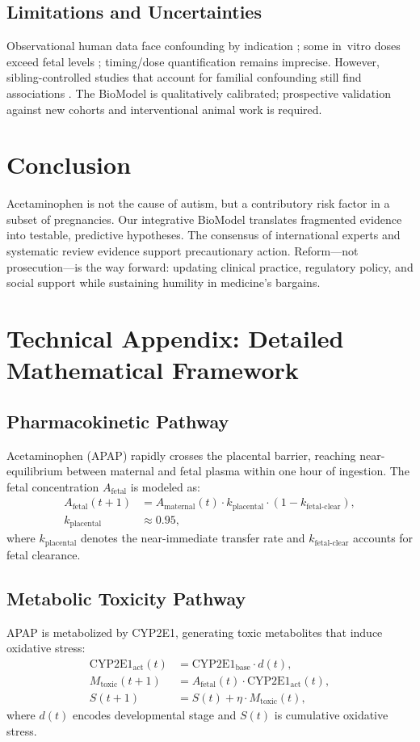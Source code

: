 \documentclass[12pt]{article}
\begin{document}
\subsection{Limitations and Uncertainties}
Observational human data face confounding by indication \citep{leppert2019}; some in~vitro doses exceed fetal levels \citep{perez2012}; timing/dose quantification remains imprecise. However, sibling-controlled studies that account for familial confounding still find associations \citep{brandlistuen2013,stergiakouli2016}. The BioModel is qualitatively calibrated; prospective validation against new cohorts and interventional animal work is required.

\section{Conclusion}
Acetaminophen is not the cause of autism, but a contributory risk factor in a subset of pregnancies. Our integrative BioModel translates fragmented evidence into testable, predictive hypotheses. The consensus of international experts \citep{bauer2021} and systematic review evidence \citep{navarro2025,masarwa2018} support precautionary action. Reform---not prosecution---is the way forward: updating clinical practice, regulatory policy, and social support while sustaining humility in medicine's bargains.

\appendix
\section{Technical Appendix: Detailed Mathematical Framework}

\subsection{Pharmacokinetic Pathway}
Acetaminophen (APAP) rapidly crosses the placental barrier, reaching near-equilibrium between maternal and fetal plasma within one hour of ingestion. The fetal concentration $A_{\text{fetal}}$ is modeled as:
\begin{align}
A_{\text{fetal}}(t+1) &= A_{\text{maternal}}(t) \cdot k_{\text{placental}} \cdot \left( 1 - k_{\text{fetal-clear}} \right), \\
k_{\text{placental}} &\approx 0.95,
\end{align}
where $k_{\text{placental}}$ denotes the near-immediate transfer rate and $k_{\text{fetal-clear}}$ accounts for fetal clearance.

\subsection{Metabolic Toxicity Pathway}
APAP is metabolized by CYP2E1, generating toxic metabolites that induce oxidative stress:
\begin{align}
\text{CYP2E1}_{\text{act}}(t) &= \text{CYP2E1}_{\text{base}} \cdot d(t), \\
M_{\text{toxic}}(t+1) &= A_{\text{fetal}}(t) \cdot \text{CYP2E1}_{\text{act}}(t), \\
S(t+1) &= S(t) + \eta \cdot M_{\text{toxic}}(t),
\end{align}
where $d(t)$ encodes developmental stage and $S(t)$ is cumulative oxidative stress.
\end{document}
